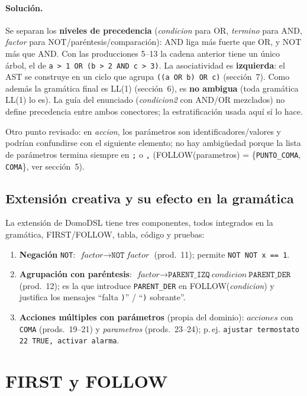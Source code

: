 \paragraph{Solución.} Se separan los \textbf{niveles de precedencia} (\textit{condicion} para OR, \textit{termino} para AND,
\textit{factor} para NOT/paréntesis/comparación): AND liga más fuerte que OR, y NOT más que AND. Con las producciones
5--13 la cadena anterior tiene un único árbol, el de \texttt{a > 1 OR (b > 2 AND c > 3)}. La asociatividad es
\textbf{izquierda}: el AST se construye en un ciclo que agrupa \texttt{((a OR b) OR c)} (sección~7).
Como además la gramática final es LL(1) (sección~6), es \textbf{no ambigua} (toda gramática LL(1) lo es).
La guía del enunciado (\textit{condicion2} con AND/OR mezclados) no define precedencia entre ambos conectores; la estratificación
usada aquí sí lo hace.

Otro punto revisado: en \textit{accion}, los parámetros son identificadores/valores y podrían confundirse con el
siguiente elemento; no hay ambigüedad porque la lista de parámetros termina siempre en \texttt{;} o \texttt{,}
(FOLLOW(parametros) = \{\texttt{PUNTO\_COMA}, \texttt{COMA}\}, ver sección~5).

\subsection{Extensión creativa y su efecto en la gramática}
La extensión de DomoDSL tiene tres componentes, todos integrados en la gramática, FIRST/FOLLOW, tabla, código y pruebas:
\begin{enumerate}[nosep]
\item \textbf{Negación} \texttt{NOT}: $\textit{factor}\to\texttt{NOT}\ \textit{factor}$ (prod.~11); permite \texttt{NOT NOT x == 1}.
\item \textbf{Agrupación con paréntesis}: $\textit{factor}\to\texttt{PARENT\_IZQ}\ \textit{condicion}\ \texttt{PARENT\_DER}$ (prod.~12); es la que introduce
\texttt{PARENT\_DER} en FOLLOW(\textit{condicion}) y justifica los mensajes ``falta \texttt{)}'' / ``\texttt{)} sobrante''.
\item \textbf{Acciones múltiples con parámetros} (propia del dominio): $\textit{acciones}$ con \texttt{COMA} (prods.~19--21) y
\textit{parametros} (prods.~23--24); p.\,ej. \texttt{ajustar termostato 22 TRUE, activar alarma}.
\end{enumerate}

\section{FIRST y FOLLOW}

